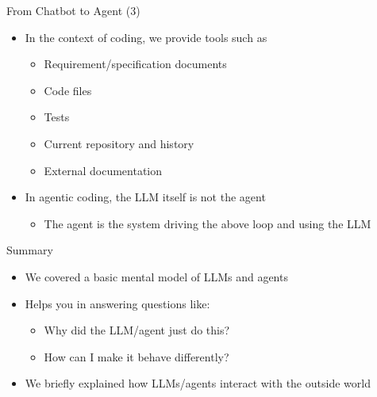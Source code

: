 \documentclass[
ps,
]{prosper}
\begin{document}
\begin{slide}{From Chatbot to Agent (3)}

\begin{itemize}

\item In the context of coding, we provide tools such as

  \begin{itemize}
    
  \item Requirement/specification documents
    
  \item Code files
    
  \item Tests
    
  \item Current repository and history
    
  \item External documentation
    
  \end{itemize}

\item In agentic coding, the LLM itself is not the agent

  \begin{itemize}

  \item The agent is the system driving the above loop and using the LLM
    
  \end{itemize}
  
\end{itemize}
  
\end{slide}




\begin{slide}{Summary}

\begin{itemize}

\item We covered a basic mental model of LLMs and agents

\item Helps you in answering questions like:

  \begin{itemize}

  \item Why did the LLM/agent just do this?

  \item How can I make it behave differently?

  \end{itemize}

\item We briefly explained how LLMs/agents interact with the outside world
  
\end{itemize}
  
\end{slide}
\end{document}
